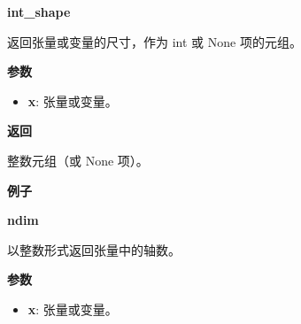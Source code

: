 \textbf{int\_shape}\label{intux5fshape}

\begin{Shaded}
\begin{Highlighting}[]
\end{Highlighting}
\end{Shaded}

返回张量或变量的尺寸，作为 int 或 None 项的元组。

\textbf{参数}

\begin{itemize}
\tightlist
\item
  \textbf{x}: 张量或变量。
\end{itemize}

\textbf{返回}

整数元组（或 None 项）。

\textbf{例子}

\begin{Shaded}
\begin{Highlighting}[]
\OperatorTok{>>>}    
\OperatorTok{>>>} \OperatorTok{=} \OperatorTok{=}\NormalTok{(}\NormalTok{, }\NormalTok{, }\NormalTok{))}
\OperatorTok{>>>} 
\NormalTok{(}\NormalTok{, }\NormalTok{, }\NormalTok{)}
\OperatorTok{>>>} \OperatorTok{=} \NormalTok{np.array([[}\NormalTok{, }\NormalTok{], [}\NormalTok{, }\NormalTok{]])}
\OperatorTok{>>>} \OperatorTok{=} \OperatorTok{=}
\OperatorTok{>>>} 
\NormalTok{(}\NormalTok{, }\NormalTok{)}
\end{Highlighting}
\end{Shaded}


\textbf{ndim}\label{ndim}

\begin{Shaded}
\begin{Highlighting}[]
\end{Highlighting}
\end{Shaded}

以整数形式返回张量中的轴数。

\textbf{参数}

\begin{itemize}
\tightlist
\item
  \textbf{x}: 张量或变量。
\end{itemize}

